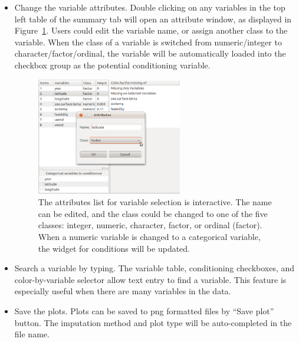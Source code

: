 \documentclass[article]{jss}
\begin{document}
\begin{itemize}
\item Change the variable attributes. Double clicking on any variables in the top left table of the summary tab will open an attribute window, as displayed in Figure~\ref{fig: attributes}. Users could edit the variable name, or assign another class to the variable. When the class of a variable is switched from numeric/integer to character/factor/ordinal, the variable will be automatically loaded into the checkbox group as the potential conditioning variable.

\begin{center}
\begin{figure}[h]
\begin{centering}
\includegraphics[width=0.6\textwidth]{graph/fig8-query}
\par\end{centering}
\caption{The attributes list for variable selection is interactive. The name can be edited, and the class could be changed to one of the five classes: integer, numeric, character, factor, or ordinal (factor). When a numeric variable is changed to a categorical variable, the widget for conditions will be updated.}
\label{fig: attributes}
\end{figure}
\par\end{center}

\item Search a variable by typing. The variable table, conditioning checkboxes, and color-by-variable selector allow text entry to find a variable. This feature is especially useful when there are many variables in the data.
\item Save the plots. Plots can be saved to png formatted files by ``Save plot'' button. The imputation method and plot type will be auto-completed in the file name.
\end{itemize}
\end{document}
